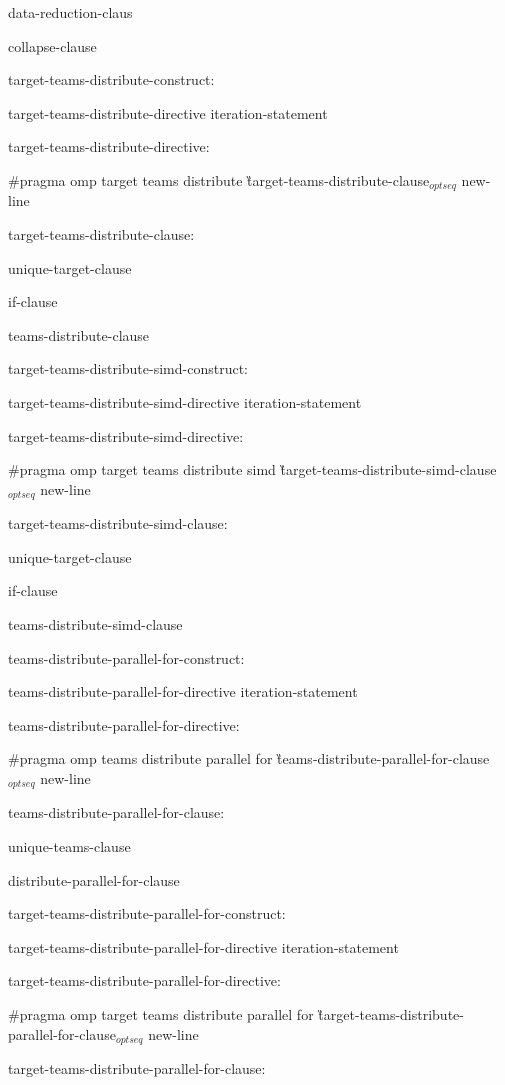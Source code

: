 {\I data-reduction-claus

\I collapse-clause

target-teams-distribute-construct:

\I target-teams-distribute-directive iteration-statement

target-teams-distribute-directive:

\C\I \#pragma omp target teams distribute \G target-teams-distribute-clause$_{optseq}$ new-line

target-teams-distribute-clause:

\I unique-target-clause

\I if-clause

\I teams-distribute-clause

target-teams-distribute-simd-construct:

\I target-teams-distribute-simd-directive iteration-statement

target-teams-distribute-simd-directive:

\C \I \#pragma omp target teams distribute simd \G target-teams-distribute-simd-clause$_{optseq}$ new-line

target-teams-distribute-simd-clause:

\I unique-target-clause

\I if-clause

\I teams-distribute-simd-clause

teams-distribute-parallel-for-construct:

\I teams-distribute-parallel-for-directive iteration-statement

teams-distribute-parallel-for-directive:

\C\I \#pragma omp teams distribute parallel for \G teams-distribute-parallel-for-clause$_{optseq}$ new-line

teams-distribute-parallel-for-clause:

\I unique-teams-clause

\I distribute-parallel-for-clause

target-teams-distribute-parallel-for-construct:

\I target-teams-distribute-parallel-for-directive iteration-statement

target-teams-distribute-parallel-for-directive:

\C\I \#pragma omp target teams distribute parallel for \G target-teams-distribute-parallel-for-clause$_{optseq}$ new-line

target-teams-distribute-parallel-for-clause:

}
